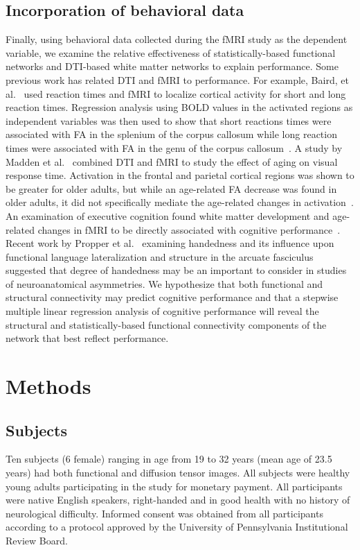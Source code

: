 \documentclass[final,authoryear,5p,times,twocolumn]{elsarticle}
\begin{document}
\subsection{Incorporation of behavioral data}
Finally, using behavioral data collected during the fMRI study as the dependent variable, we examine the relative effectiveness of statistically-based functional networks and DTI-based white matter networks to explain performance. Some previous work has related DTI and fMRI to performance. For example, Baird, et al.\ \cite{Baird2005} used reaction times and fMRI to localize cortical activity for short and long reaction times. Regression analysis using BOLD values in the activated regions as independent variables was then used to show that short reactions times were associated with FA in the splenium of the corpus callosum while long reaction times were associated with FA in the genu of the corpus callosum~\cite{Baird2005}. A study by Madden et al.\ \cite{Madden2007} combined DTI and fMRI to study the effect of aging on visual response time. Activation in the frontal and parietal cortical regions was shown to be greater for older adults, but while an age-related FA decrease was found in older adults, it did not specifically mediate the age-related changes in activation~\cite{Madden2007}. An examination of executive cognition found white matter development and age-related changes in fMRI to be directly associated with cognitive performance~\cite{Stevens2009}. Recent work by Propper et al.\ \cite{Propper2010} examining handedness and its influence upon functional language lateralization and structure in the arcuate fasciculus suggested that degree of handedness may be an important to consider in studies of neuroanatomical asymmetries.  We hypothesize that both functional and structural connectivity may predict cognitive performance and that a stepwise multiple linear regression analysis of cognitive performance will reveal the structural and statistically-based functional connectivity components of the network that best reflect performance. 

\section{Methods}

\subsection{Subjects}
Ten subjects (6 female) ranging in age from 19 to 32 years (mean age of 23.5 years) had both functional and diffusion tensor images. All subjects were healthy young adults participating in the study for monetary payment. All participants were native English speakers, right-handed and in good health with no history of neurological difficulty. Informed consent was obtained from all participants according to a protocol approved by the University of Pennsylvania Institutional Review Board. 
\end{document}
